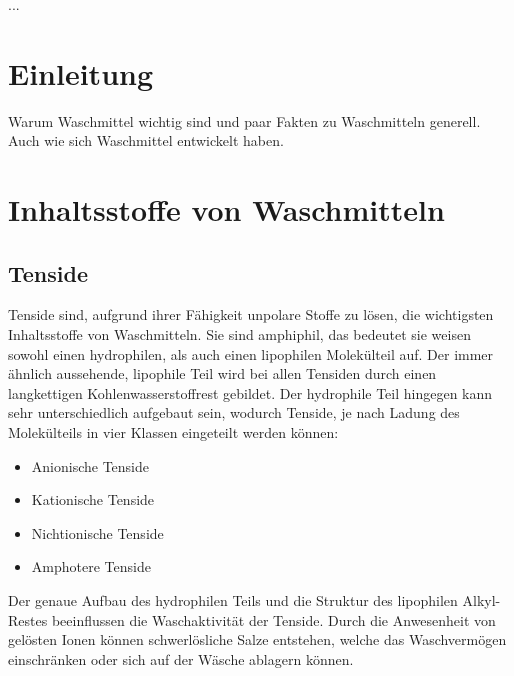 \documentclass[12pt, ngerman]{article}
\begin{document}

\newcommand{\VWAtitel}{"`Nicht nur sauber, sondern rein"' - Waschmittel und ihre Inhaltsstoffe}
\newcommand{\VWAauthor}{Hofmann Michael}
\newcommand{\klasse}{8C}
\newcommand{\jahr}{2022/23}
\newcommand{\betreuungslehrperson}{Mag. Barbara Hirss}
\newcommand{\vorlagedatum}{tt.mm.jjjj}


\setcounter{page}{2}

\abstract
...
\tableofcontents
\clearpage
{}

\section{Einleitung}
Warum Waschmittel wichtig sind und paar Fakten zu Waschmitteln generell. Auch wie sich Waschmittel entwickelt haben.

\section{Inhaltsstoffe von Waschmitteln}


\subsection{Tenside}

Tenside sind, aufgrund ihrer Fähigkeit unpolare Stoffe zu lösen, die wichtigsten Inhaltsstoffe von Waschmitteln. Sie sind amphiphil, das bedeutet sie weisen sowohl einen hydrophilen, als auch einen lipophilen Molekülteil auf. Der immer ähnlich aussehende, lipophile Teil wird bei allen Tensiden durch einen langkettigen Kohlenwasserstoffrest gebildet. Der hydrophile Teil hingegen kann sehr unterschiedlich aufgebaut sein, wodurch Tenside, je nach Ladung des Molekülteils in vier Klassen eingeteilt werden können:
\begin{itemize}
	\item Anionische Tenside
	\item Kationische Tenside
	\item Nichtionische Tenside
	\item Amphotere Tenside
\end{itemize}

Der genaue Aufbau des hydrophilen Teils und die Struktur des lipophilen Alkyl-Restes beeinflussen die Waschaktivität der Tenside. Durch die Anwesenheit von gelösten Ionen können schwerlösliche Salze entstehen, welche das Waschvermögen einschränken oder sich auf der Wäsche ablagern können.
\end{document}
